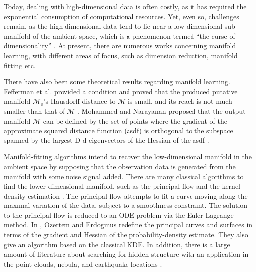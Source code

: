 \documentclass[aos,preprint]{imsart}
\theoremstyle{remark}
\begin{document}
Today, dealing with high-dimensional data is often costly, as it has required the exponential consumption of computational resources. Yet, even so, challenges remain, as the high-dimensional data tend to lie near a low dimensional sub-manifold of the ambient space, which is a phenomenon termed ``the curse of dimensionality'' \cite{fefferman2018fitting}. At present, there are numerous works concerning manifold learning, with different areas of focus, such as dimension reduction, manifold fitting etc. 

There have also been some theoretical results regarding manifold learning. Fefferman et al. provided a condition and proved that the produced putative manifold ${\mathcal M}_o$'s Hausdorff distance to $\mathcal M$ is small, and its reach is not much smaller than that of $\mathcal M$ \cite{fefferman2018fitting}. Mohammed and Narayanan proposed that the output manifold $\mathcal M$ can be defined by the set of points where the gradient of the approximate squared distance function (asdf) is orthogonal to the subspace spanned by the largest D-d eigenvectors of the Hessian of the asdf \cite{mohammed2017manifold}.




Manifold-fitting algorithms intend to recover the low-dimensional manifold in the ambient space by supposing that the observation data is generated from the manifold with some noise signal added. There are many classical algorithms to find the lower-dimensional manifold, such as the principal flow \cite{panaretos2014principal} and the kernel-density estimation \cite{ozertem2011locally}. The principal flow attempts to fit a curve moving along the maximal variation of the data, subject to a smoothness constraint. The solution to the principal flow is reduced to an ODE problem via the Euler-Lagrange method. In \cite{ozertem2011locally}, Ozertem and Erdogmus redefine the principal curves and surfaces in terms of the gradient and Hessian of the probability-density estimate. They also give an algorithm based on the classical KDE. In addition, there is a large amount of literature about searching for hidden structure with an application in the point clouds, nebula, and earthquake locations \cite{adams2011morse,davenport2010joint,klemela2009smoothing}.
\end{document}
